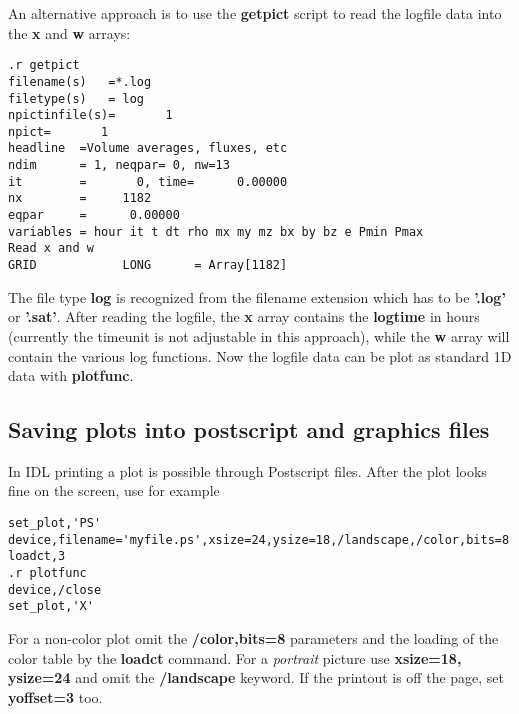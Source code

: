 An alternative approach is to use the {\bf getpict} script to read
the logfile data into the {\bf x} and {\bf w} arrays:
\begin{verbatim}
.r getpict
filename(s)   =*.log
filetype(s)   = log
npictinfile(s)=       1
npict=       1
headline  =Volume averages, fluxes, etc
ndim      = 1, neqpar= 0, nw=13
it        =       0, time=      0.00000
nx        =     1182
eqpar     =      0.00000
variables = hour it t dt rho mx my mz bx by bz e Pmin Pmax
Read x and w
GRID            LONG      = Array[1182]
\end{verbatim}
The file type {\bf log} is recognized from the filename extension which
has to be {\bf '.log'} or {\bf '.sat'}. After reading the logfile,
the {\bf x} array contains the {\bf logtime} in hours 
(currently the timeunit is not adjustable in this approach), 
while the {\bf w} array will contain the various log functions. 
Now the logfile data can be plot as standard 1D data with {\bf plotfunc}.

\subsection{Saving plots into postscript and graphics files 
                \label{s-postscript}}

In IDL printing a plot is possible through Postscript files.
After the plot looks fine on the screen, use for example
\begin{verbatim}
set_plot,'PS'
device,filename='myfile.ps',xsize=24,ysize=18,/landscape,/color,bits=8
loadct,3
.r plotfunc
device,/close
set_plot,'X'
\end{verbatim}
For a non-color plot omit the {\bf /color,bits=8} parameters and the 
loading of the color table by the {\bf loadct} command. For a {\it portrait}
picture use {\bf xsize=18, ysize=24} and omit the {\bf /landscape} keyword.
If the printout is off the page, set {\bf yoffset=3} too.

